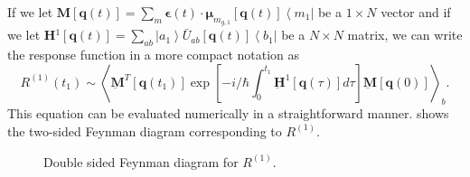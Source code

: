 \documentclass{article}
\newcommand{\bra}[1]{\ensuremath{\left\langle#1\right|}}
\newcommand{\ket}[1]{\ensuremath{\left|#1\right\rangle}}
\newcommand{\vect}[1]{\ensuremath{\boldsymbol{\mathbf{#1}}}}
\newcommand{\arw}{-{Latex[length=2mm]}}
\begin{document}
If we let \underline{$\vect M$}$[\vect q(t)]=\sum_{m}\vect\epsilon(t)\cdot \vect\mu_{m_{g,1}}[\vect q(t)] \bra{m_{1}}$ be a $1\times N$ vector and if we let \underline{$\vect H$}$^{1}[\vect q(t)]=\sum_{ab}\ket{a_{1}}\bar U_{ab}[\vect q(t)]\bra{b_{1}}$ be a $N\times N$ matrix, we can write the response function in a more compact notation as
\begin{equation}
R^{(1)}(t_{1})\sim\left\langle \underbar{\vect{M}}^{T}[\vect q(t_{1})]\exp\left[-i/\hbar\int_{0}^{t_{1}}\underbar{\vect{H}}^{1}[\vect q(\tau)]d\tau\right] \underbar{\vect{M}} [\vect q(0)] \right\rangle_{b}.
\end{equation}
This equation can be evaluated numerically in a straightforward manner.
 shows the two-sided Feynman diagram corresponding to $R^{(1)}$.

\begin{figure}
\centering
{}
\caption{Double sided Feynman diagram for $R^{(1)}$.}\label{fig:fd1}
\end{figure}
\end{document}
